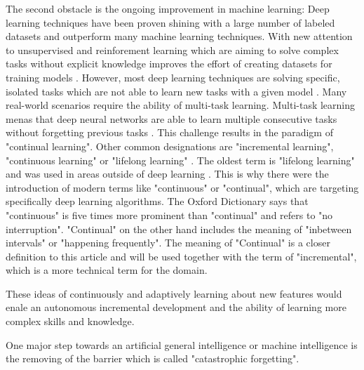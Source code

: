 The second obstacle is the ongoing improvement in machine learning:
\hfill \break
Deep learning techniques have been proven shining with a large number of labeled datasets and outperform many machine learning techniques.
With new attention to unsupervised and reinforement learning which are aiming to solve complex tasks without explicit knowledge improves the effort of creating datasets for training models \cite{continual-ai-blog, alphastar}.
However, most deep learning techniques are solving specific, isolated tasks which are not able to learn new tasks with a given model \cite{continual-ai-blog}.
Many real-world scenarios require the ability of multi-task learning.
Multi-task learning menas that deep neural networks are able to learn multiple consecutive tasks without forgetting previous tasks \cite{elastic-weight-consolidation}.
This challenge results in the paradigm of "continual learning".
Other common designations are "incremental learning", "continuous learning" or "lifelong learning" \cite{lifelong-machine-learning-book, continual-ai-blog}.
The oldest term is "lifelong learning" and was used in areas outside of deep learning \cite{continual-ai-blog}.
This is why there were the introduction of modern terms like "continuous" or "continual", which are targeting specifically deep learning algorithms.
\cite{continual-ai-blog}
The Oxford Dictionary says that "continuous" is five times more prominent than "continual" and refers to "no interruption". "Continual" on the other hand includes the meaning of "inbetween intervals" or "happening frequently".
\cite{oxford-continual-continuous}
The meaning of "Continual" is a closer definition to this article and will be used together with the term of "incremental", which is a more technical term for the domain.
\hfill \break




These ideas of continuously and adaptively learning about new features would enale an autonomous incremental development and the ability of learning more complex skills and knowledge.
\cite{continual-ai-blog}

One major step towards an artificial general intelligence or machine intelligence is the removing of the barrier which is called "catastrophic forgetting".

